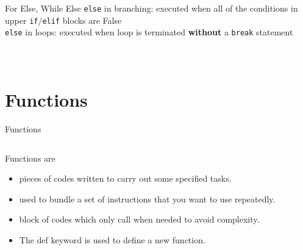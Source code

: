         \begin{frame}{For Else, While Else}
            \texttt{else} in branching: executed when all of the conditions in upper \texttt{if}/\texttt{elif} blocks are False\\
            \texttt{else} in loops: executed when loop is terminated \textbf{without} a \texttt{break} statement
            \vspace{-3mm}
            \begin{columns}
                \begin{column}{0.52\textwidth}
                    \inputminted[frame=single,framesep=2pt]{python3}{../Review1/code-examples/while_else.py}
                \end{column}
                \begin{column}{0.48\textwidth}
                    \inputminted[frame=single,framesep=2pt]{python3}{../Review1/code-examples/for_else.py}
                \end{column}
            \end{columns}
        \end{frame}

    \section{Functions}
        \begin{frame}{Functions}
            \begin{columns}
                \begin{column}{0.50\textwidth}
                    Functions are
                    \begin{itemize}
                        \item pieces of codes written to carry out some specified tasks.
                        \item used to bundle a set of instructions that you want to use repeatedly.
                        \item block of codes which only call when needed to avoid complexity.
                        \newline
                        \item The def keyword is used to define a new function.
                    \end{itemize}
                    \pause
                \end{column}
                \begin{column}{0.50\textwidth}
                    \inputminted[frame=single,framesep=2pt, lastline=8]{python3}{code-examples/function_def.py}
                    \pause
                    \inputminted[frame=single,framesep=2pt, lastline=8]{python3}{code-examples/function_def2.py}
                    \pause
                    \inputminted[frame=single,framesep=2pt, lastline=8]{python3}{code-examples/function_def3.py}
                \end{column}
            \end{columns}
        \end{frame}   
            

